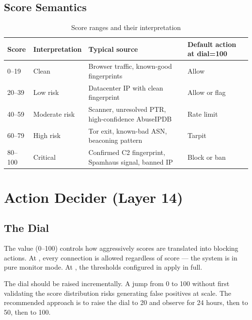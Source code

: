 \subsection{Score Semantics}

\begin{fullwidth}
\begin{table}[h]
\caption{Score ranges and their interpretation}
\label{tab:score-ranges}
\begin{tabular}{@{}lllp{6cm}@{}}
\toprule
\textbf{Score} & \textbf{Interpretation} & \textbf{Typical source} & \textbf{Default action at dial=100} \\
\midrule
0–19 & Clean & Browser traffic, known-good fingerprints & Allow \\
20–39 & Low risk & Datacenter IP with clean fingerprint & Allow or flag \\
40–59 & Moderate risk & Scanner, unresolved PTR, high-confidence AbuseIPDB & Rate limit \\
60–79 & High risk & Tor exit, known-bad ASN, beaconing pattern & Tarpit \\
80–100 & Critical & Confirmed C2 fingerprint, Spamhaus signal, banned IP & Block or ban \\
\bottomrule
\end{tabular}
\end{table}
\end{fullwidth}

\section{Action Decider (Layer 14)}

\subsection{The Dial}

The  value (0–100) controls how aggressively scores are translated into
blocking actions. At , every connection is allowed regardless of score —
the system is in pure monitor mode. At , the thresholds configured in
 apply in full.

\begin{notebox}
The dial should be raised incrementally. A jump from 0 to 100 without first validating
the score distribution risks generating false positives at scale. The recommended approach
is to raise the dial to 20 and observe for 24 hours, then to 50, then to 100.
\end{notebox}

